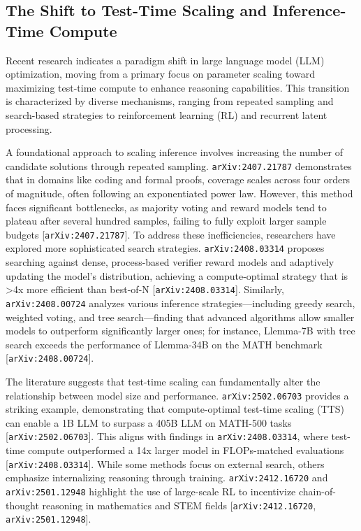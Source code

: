 \documentclass[11pt]{article}
\begin{document}
\subsection{The Shift to Test-Time Scaling and Inference-Time Compute}

Recent research indicates a paradigm shift in large language model (LLM) optimization, moving from a primary focus on parameter scaling toward maximizing test-time compute to enhance reasoning capabilities. This transition is characterized by diverse mechanisms, ranging from repeated sampling and search-based strategies to reinforcement learning (RL) and recurrent latent processing.

A foundational approach to scaling inference involves increasing the number of candidate solutions through repeated sampling. \texttt{arXiv:2407.21787} demonstrates that in domains like coding and formal proofs, coverage scales across four orders of magnitude, often following an exponentiated power law. However, this method faces significant bottlenecks, as majority voting and reward models tend to plateau after several hundred samples, failing to fully exploit larger sample budgets [\texttt{arXiv:2407.21787}]. To address these inefficiencies, researchers have explored more sophisticated search strategies. \texttt{arXiv:2408.03314} proposes searching against dense, process-based verifier reward models and adaptively updating the model's distribution, achieving a compute-optimal strategy that is >4x more efficient than best-of-N [\texttt{arXiv:2408.03314}]. Similarly, \texttt{arXiv:2408.00724} analyzes various inference strategies—including greedy search, weighted voting, and tree search—finding that advanced algorithms allow smaller models to outperform significantly larger ones; for instance, Llemma-7B with tree search exceeds the performance of Llemma-34B on the MATH benchmark [\texttt{arXiv:2408.00724}].

The literature suggests that test-time scaling can fundamentally alter the relationship between model size and performance. \texttt{arXiv:2502.06703} provides a striking example, demonstrating that compute-optimal test-time scaling (TTS) can enable a 1B LLM to surpass a 405B LLM on MATH-500 tasks [\texttt{arXiv:2502.06703}]. This aligns with findings in \texttt{arXiv:2408.03314}, where test-time compute outperformed a 14x larger model in FLOPs-matched evaluations [\texttt{arXiv:2408.03314}]. While some methods focus on external search, others emphasize internalizing reasoning through training. \texttt{arXiv:2412.16720} and \texttt{arXiv:2501.12948} highlight the use of large-scale RL to incentivize chain-of-thought reasoning in mathematics and STEM fields [\texttt{arXiv:2412.16720}, \texttt{arXiv:2501.12948}].
\end{document}
